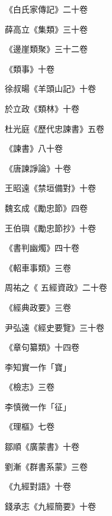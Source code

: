 \begin{pinyinscope}
 《白氏家傳記》二十卷



 薛高立《集類》三十卷



 《邊崖類聚》三十二卷



 《類事》十卷



 徐叔暘《羊頭山記》十卷



 於立政《類林》十卷



 杜光庭《歷代忠諫書》五卷



 《諫書》八十卷



 《唐諫諍論》十卷



 王昭遠《禁垣備對》十卷



 魏玄成《勵忠節》四卷



 王伯璵《勵忠節抄》十卷



 《書判幽燭》四十卷



 《軺車事類》三卷



 周祐之《
 五經資政》二十卷



 《經典政要》三卷



 尹弘遠《經史要覽》三十卷



 《章句纂類》十四卷



 李知實一作「寶」



 《檢志》三卷



 李慎微一作「征」



 《理樞》七卷



 鄒順《廣蒙書》十卷



 劉漸《群書系蒙》三卷



 《九經對語》十卷



 錢承志《九經簡要》十卷




\end{pinyinscope}
